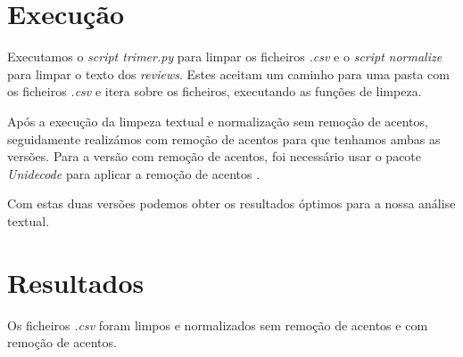 \section{Execução}

Executamos o \textit{script trimer.py} para limpar os ficheiros \textit{.csv} \cite{gfg1} e o \textit{script} \textit{normalize} para limpar o texto dos \textit{reviews}. Estes aceitam um caminho para uma pasta com os ficheiros \textit{.csv} e itera sobre os ficheiros, executando as funções de limpeza.

Após a execução da limpeza textual e normalização sem remoção de acentos, seguidamente realizámos com remoção de acentos para que tenhamos ambas as versões. Para a versão com remoção de acentos, foi necessário usar o pacote \textit{Unidecode} para aplicar a remoção de acentos \cite{cr1}.

Com estas duas versões podemos obter os resultados óptimos para a nossa análise textual.

\section{Resultados}

Os ficheiros \textit{.csv} foram limpos e normalizados sem remoção de acentos e com remoção de acentos.